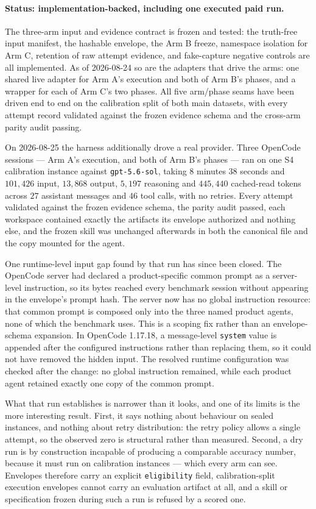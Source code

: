 \paragraph{Status: implementation-backed, including one executed paid run.}
The three-arm input and evidence contract is frozen and tested: the truth-free input
manifest, the hashable envelope, the Arm B freeze, namespace isolation for Arm C, retention
of raw attempt evidence, and fake-capture negative controls are all implemented. As of
2026-08-24 so are the adapters that drive the arms: one shared live adapter for Arm A's
execution and both of Arm B's phases, and a wrapper for each of Arm C's two phases. All
five arm/phase seams have been driven end to end on the calibration split of both main
datasets, with every attempt record validated against the frozen evidence schema and the
cross-arm parity audit passing.

On 2026-08-25 the harness additionally drove a real provider. Three OpenCode sessions ---
Arm A's execution, and both of Arm B's phases --- ran on one S4 calibration instance against
\texttt{gpt-5.6-sol}, taking $8$ minutes $38$ seconds and $101{,}426$ input, $13{,}868$
output, $5{,}197$ reasoning and $445{,}440$ cached-read tokens across $27$ assistant
messages and $46$ tool calls, with no retries. Every attempt validated against the frozen
evidence schema, the parity audit passed, each workspace contained exactly the artifacts its
envelope authorized and nothing else, and the frozen skill was unchanged afterwards in both
the canonical file and the copy mounted for the agent.

One runtime-level input gap found by that run has since been closed. The OpenCode server had
declared a product-specific common prompt as a server-level instruction, so its bytes reached
every benchmark session without appearing in the envelope's prompt hash. The server now has no
global instruction resource: that common prompt is composed only into the three named product
agents, none of which the benchmark uses. This is a scoping fix rather than an envelope-schema
expansion. In OpenCode 1.17.18, a message-level \texttt{system} value is appended after the
configured instructions rather than replacing them, so it could not have removed the hidden
input. The resolved runtime configuration was checked after the change: no global instruction
remained, while each product agent retained exactly one copy of the common prompt.

What that run establishes is narrower than it looks, and one of its limits is the more
interesting result. First, it says nothing about behaviour on sealed instances, and nothing
about retry distribution: the retry policy allows a single attempt, so the observed zero is
structural rather than measured. Second, a dry run is by construction incapable of producing
a comparable accuracy number, because it must run on calibration instances --- which every
arm can see. Envelopes therefore carry an explicit \texttt{eligibility} field,
calibration-split execution envelopes cannot carry an evaluation artifact at all, and a skill
or specification frozen during such a run is refused by a scored one.

